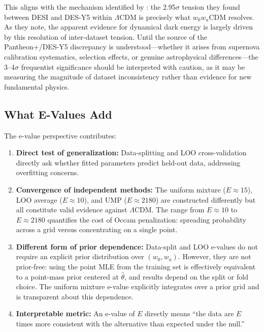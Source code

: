 \documentclass[11pt,a4paper]{article}
\newcommand{\LCDM}{$\Lambda$CDM}
\begin{document}
This aligns with the mechanism identified by \citet{OngBayesian2025}: the 2.95$\sigma$ tension they found between DESI and DES-Y5 within \LCDM{} is precisely what $w_0w_a$CDM resolves. As they note, the apparent evidence for dynamical dark energy is largely driven by this resolution of inter-dataset tension. Until the source of the Pantheon+/DES-Y5 discrepancy is understood---whether it arises from supernova calibration systematics, selection effects, or genuine astrophysical differences---the 3--4$\sigma$ frequentist significance should be interpreted with caution, as it may be measuring the magnitude of dataset inconsistency rather than evidence for new fundamental physics.

\subsection{What E-Values Add}

The e-value perspective contributes:
\begin{enumerate}
    \item \textbf{Direct test of generalization:} Data-splitting and LOO cross-validation directly ask whether fitted parameters predict held-out data, addressing overfitting concerns.

    \item \textbf{Convergence of independent methods:} The uniform mixture ($E \approx 15$), LOO average ($E \approx 10$), and UMP ($E \approx 2180$) are constructed differently but all constitute valid evidence against \LCDM. The range from $E \approx 10$ to $E \approx 2180$ quantifies the cost of Occam penalization: spreading probability across a grid versus concentrating on a single point.

    \item \textbf{Different form of prior dependence:} Data-split and LOO e-values do not require an explicit prior distribution over $(w_0, w_a)$. However, they are not prior-free: using the point MLE from the training set is effectively equivalent to a point-mass prior centered at $\hat{\theta}$, and results depend on the split or fold choice. The uniform mixture e-value explicitly integrates over a prior grid and is transparent about this dependence.

    \item \textbf{Interpretable metric:} An e-value of $E$ directly means ``the data are $E$ times more consistent with the alternative than expected under the null.''
\end{enumerate}
\end{document}
